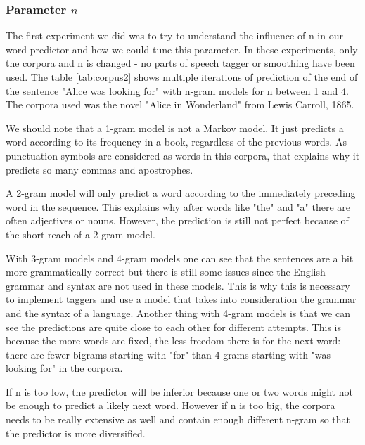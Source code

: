 \documentclass[a4paper,12pt]{article}
\begin{document}
\subsubsection{Parameter $n$}
	The first experiment we did was to try to understand the influence of n in our word predictor and how we could tune this parameter. In these experiments, only the corpora and n is changed - no parts of speech tagger or smoothing have been used. The table \ref{tab:corpus2} shows multiple iterations of prediction of the end of the sentence "Alice was looking for" with n-gram models for n between 1 and 4. The corpora used was the novel "Alice in Wonderland" from Lewis Carroll, 1865. 
	
We should note that a 1-gram model is not a Markov model. It just predicts a word according to its frequency in a book, regardless of the previous words. As punctuation symbols are considered as words in this corpora, that explains why it predicts so many commas and apostrophes. 

A 2-gram model will only predict a word according to the immediately preceding word in the sequence. This explains why after words like "the" and "a" there are often adjectives or nouns. However, the prediction is still not perfect because of the short reach of a 2-gram model.

With 3-gram models and 4-gram models one can see that the sentences are a bit more grammatically correct but there is still some issues since the English grammar and syntax are not used in these models. This is why this is necessary to implement taggers and use a model that takes into consideration the grammar and the syntax of a language. Another thing with 4-gram models is that we can see the predictions are quite close to each other for different attempts. This is because the more words are fixed, the less freedom there is for the next word: there are fewer bigrams starting with "for" than 4-grams starting with "was looking for" in the corpora.
	
If n is too low, the predictor will be inferior because one or two words might not be enough to predict a likely next word. However if n is too big, the corpora needs to be really extensive as well and contain enough different n-gram so that the predictor is more diversified.
\end{document}
